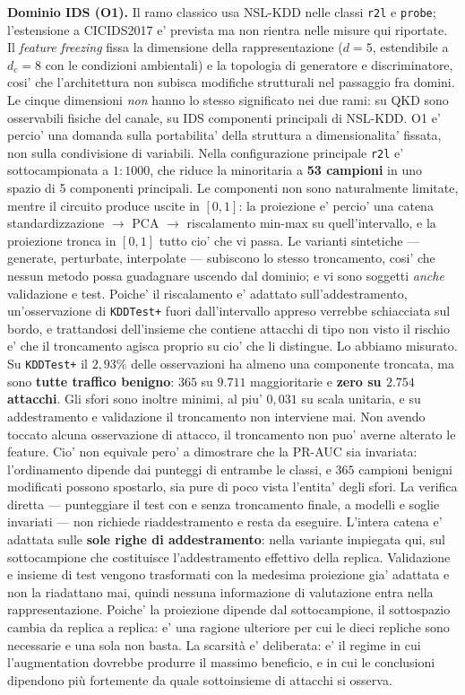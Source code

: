 \documentclass[10pt,conference,a4paper,twocolumn]{IEEEtran}
\begin{document}
\textbf{Dominio IDS (O1).} Il ramo classico usa NSL-KDD nelle classi \texttt{r2l} e \texttt{probe}; l'estensione a CICIDS2017 e' prevista ma non rientra nelle misure qui riportate. Il \textit{feature freezing} fissa la dimensione della rappresentazione ($d = 5$, estendibile a $d_c = 8$ con le condizioni ambientali) e la topologia di generatore e discriminatore, cosi' che l'architettura non subisca modifiche strutturali nel passaggio fra domini. Le cinque dimensioni \emph{non} hanno lo stesso significato nei due rami: su QKD sono osservabili fisiche del canale, su IDS componenti principali di NSL-KDD. O1 e' percio' una domanda sulla portabilita' della struttura a dimensionalita' fissata, non sulla condivisione di variabili. Nella configurazione principale \texttt{r2l} e' sottocampionata a $1{:}1000$, che riduce la minoritaria a \textbf{53 campioni} in uno spazio di 5 componenti principali. Le componenti non sono naturalmente limitate, mentre il circuito produce uscite in $[0,1]$: la proiezione e' percio' una catena standardizzazione $\to$ PCA $\to$ riscalamento min-max su quell'intervallo, e la proiezione tronca in $[0,1]$ tutto cio' che vi passa. Le varianti sintetiche — generate, perturbate, interpolate — subiscono lo stesso troncamento, cosi' che nessun metodo possa guadagnare uscendo dal dominio; e vi sono soggetti \emph{anche} validazione e test. Poiche' il riscalamento e' adattato sull'addestramento, un'osservazione di \texttt{KDDTest+} fuori dall'intervallo appreso verrebbe schiacciata sul bordo, e trattandosi dell'insieme che contiene attacchi di tipo non visto il rischio e' che il troncamento agisca proprio su cio' che li distingue. Lo abbiamo misurato. Su \texttt{KDDTest+} il $2{,}93\%$ delle osservazioni ha almeno una componente troncata, ma sono \textbf{tutte traffico benigno}: $365$ su $9.711$ maggioritarie e \textbf{zero su $2.754$ attacchi}. Gli sfori sono inoltre minimi, al piu' $0{,}031$ su scala unitaria, e su addestramento e validazione il troncamento non interviene mai. Non avendo toccato alcuna osservazione di attacco, il troncamento non puo' averne alterato le feature. Cio' non equivale pero' a dimostrare che la PR-AUC sia invariata: l'ordinamento dipende dai punteggi di entrambe le classi, e $365$ campioni benigni modificati possono spostarlo, sia pure di poco vista l'entita' degli sfori. La verifica diretta — punteggiare il test con e senza troncamento finale, a modelli e soglie invariati — non richiede riaddestramento e resta da eseguire. L'intera catena e' adattata sulle \textbf{sole righe di addestramento}: nella variante impiegata qui, sul sottocampione che costituisce l'addestramento effettivo della replica. Validazione e insieme di test vengono trasformati con la medesima proiezione gia' adattata e non la riadattano mai, quindi nessuna informazione di valutazione entra nella rappresentazione. Poiche' la proiezione dipende dal sottocampione, il sottospazio cambia da replica a replica: e' una ragione ulteriore per cui le dieci repliche sono necessarie e una sola non basta. La scarsità e' deliberata: e' il regime in cui l'augmentation dovrebbe produrre il massimo beneficio, e in cui le conclusioni dipendono più fortemente da quale sottoinsieme di attacchi si osserva.
\end{document}
